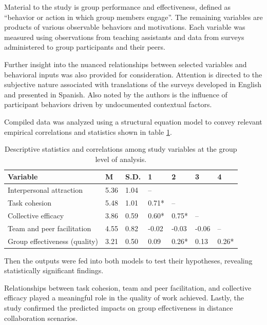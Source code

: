 \documentclass[sn-nature]{sn-jnl}%
\theoremstyle{thmstyleone}%
\theoremstyle{thmstyletwo}%
\theoremstyle{thmstylethree}%
\begin{document}
Material to the study is group performance and effectiveness, defined as “behavior or action in which group members engage”\cite{gonzalez_impact_2003}. The remaining variables are products of various observable behaviors and motivations. Each variable was measured using observations from teaching assistants and data from surveys administered to group participants and their peers.

Further insight into the nuanced relationships between selected variables and behavioral inputs was also provided for consideration. Attention is directed to the subjective nature associated with translations of the surveys developed in English and presented in Spanish. Also noted by the authors is the influence of participant behaviors driven by undocumented contextual factors.

Compiled data was analyzed using a structural equation model to convey relevant empirical correlations and statistics shown in table \ref{table:1}.\\ \begin{table}[h]
\centering
\begin{tabular}{l l l l l l l }
\hline
Variable & M & S.D. & 1 & 2 & 3 & 4 \\
\hline
Interpersonal attraction & 5.36 & 1.04 & – & & & \\

Task cohesion & 5.48 & 1.01 & 0.71* & – & & \\

Collective efficacy & 3.86 & 0.59 & 0.60* & 0.75* & – & \\

Team and peer facilitation & 4.55 & 0.82 & -0.02 & -0.03 & -0.06 & – \\

Group effectiveness (quality) & 3.21 & 0.50 & 0.09 & 0.26* & 0.13 & 0.26* \\
\hline
\end{tabular}
\caption{Descriptive statistics and correlations among study variables at the group level of analysis\cite{gonzalez_impact_2003}.}
\label{table:1}
\end{table} 

Then the outputs were fed into both models to test their hypotheses, revealing statistically significant findings.

Relationships between task cohesion, team and peer facilitation, and collective efficacy played a meaningful role in the quality of work achieved. Lastly, the study confirmed the predicted impacts on group effectiveness in distance collaboration scenarios. 
\end{document}
